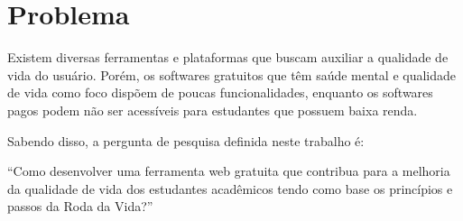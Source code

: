 \section{Problema}

Existem diversas ferramentas e plataformas que buscam auxiliar a qualidade de vida do usuário. Porém, os softwares gratuitos que têm saúde mental e qualidade de vida como foco dispõem de poucas funcionalidades, enquanto os softwares pagos podem não ser acessíveis para estudantes que possuem baixa renda.

Sabendo disso, a pergunta de pesquisa definida neste trabalho é:

“Como desenvolver uma ferramenta web gratuita que contribua para a melhoria da qualidade de vida dos estudantes acadêmicos tendo como base os princípios e passos da Roda da Vida?”